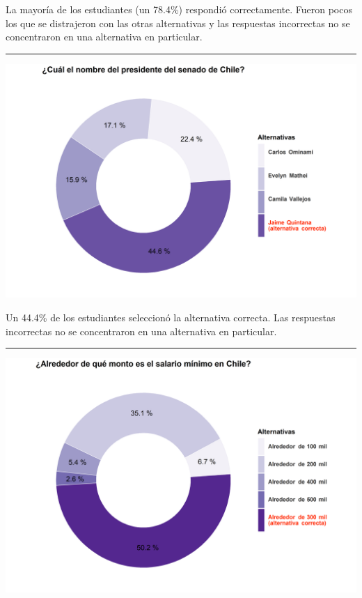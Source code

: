 \documentclass[
  14pt,
]{book}
\let\origfigure\figure
\let\endorigfigure\endfigure
\renewenvironment{figure}[1][2] {
  \expandafter\origfigure\expandafter[H]
} {
  \endorigfigure
}
\begin{document}
La mayoría de los estudiantes (un 78.4\%) respondió correctamente. Fueron pocos los que se distrajeron con las otras alternativas y las respuestas incorrectas no se concentraron en una alternativa en particular.

\begin{center}\rule{0.5\linewidth}{0.5pt}\end{center}

\begin{figure}[!ht]

{\centering \includegraphics[width=0.8\linewidth,]{images/ccivico_9} 

}

\caption{Presidente del senado de Chile}\label{fig:unnamed-chunk-13}
\end{figure}

Un 44.4\% de los estudiantes seleccionó la alternativa correcta. Las respuestas incorrectas no se concentraron en una alternativa en particular.

\begin{center}\rule{0.5\linewidth}{0.5pt}\end{center}

\begin{figure}[!ht]

{\centering \includegraphics[width=0.8\linewidth,]{images/ccivico_10} 

}

\caption{Salario mínimo en Chile}\label{fig:unnamed-chunk-14}
\end{figure}
\end{document}
